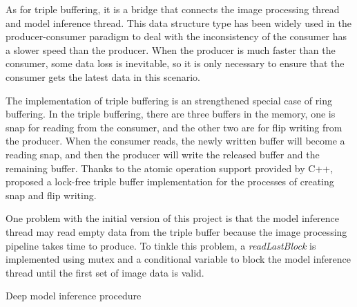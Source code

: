 As for triple buffering, it is a bridge that connects the image processing thread and model inference thread.
This data structure type has been widely used in the producer-consumer paradigm to deal with the inconsistency of the consumer has a slower speed than the producer.
When the producer is much faster than the consumer, some data loss is inevitable, so it is only necessary to ensure that the consumer gets the latest data in this scenario.

The implementation of triple buffering is an strengthened special case of ring buffering.
In the triple buffering, there are three buffers in the memory, one is snap for reading from the consumer, and the other two are for flip writing from the producer.
When the consumer reads, the newly written buffer will become a reading snap, and then the producer will write the released buffer and the remaining buffer.
Thanks to the atomic operation support provided by C++, \citet{andre2021triple} proposed a lock-free triple buffer implementation for the processes of creating snap and flip writing.

One problem with the initial version of this project is that the model inference thread may read empty data from the triple buffer because the image processing pipeline takes time to produce.
To tinkle this problem, a \textit{readLastBlock} is implemented using mutex and a conditional variable to block the model inference thread until the first set of image data is valid.

\begin{algorithm}[!ht]
\caption{Deep model inference procedure}
\label{algo:Deep model inference procedure}

\end{algorithm}
